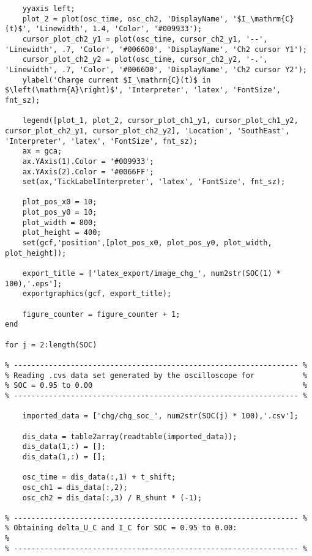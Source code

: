 \begin{lstlisting}
    yyaxis left;
    plot_2 = plot(osc_time, osc_ch2, 'DisplayName', '$I_\mathrm{C}(t)$', 'Linewidth', 1.4, 'Color', '#009933');
    cursor_plot_ch2_y1 = plot(osc_time, cursor_ch2_y1, '--', 'Linewidth', .7, 'Color', '#006600', 'DisplayName', 'Ch2 cursor Y1');
    cursor_plot_ch2_y2 = plot(osc_time, cursor_ch2_y2, '-.', 'Linewidth', .7, 'Color', '#006600', 'DisplayName', 'Ch2 cursor Y2');
    ylabel('Charge current $I_\mathrm{C}(t)$ in $\left(\mathrm{A}\right)$', 'Interpreter', 'latex', 'FontSize', fnt_sz);

    legend([plot_1, plot_2, cursor_plot_ch1_y1, cursor_plot_ch1_y2, cursor_plot_ch2_y1, cursor_plot_ch2_y2], 'Location', 'SouthEast', 'Interpreter', 'latex', 'FontSize', fnt_sz);
    ax = gca;
    ax.YAxis(1).Color = '#009933';
    ax.YAxis(2).Color = '#0066FF';
    set(ax,'TickLabelInterpreter', 'latex', 'FontSize', fnt_sz);

    plot_pos_x0 = 10;
    plot_pos_y0 = 10;
    plot_width = 800;
    plot_height = 400;
    set(gcf,'position',[plot_pos_x0, plot_pos_y0, plot_width, plot_height]);

    export_title = ['latex_export/image_chg_', num2str(SOC(1) * 100),'.eps'];
    exportgraphics(gcf, export_title);

    figure_counter = figure_counter + 1;
end

for j = 2:length(SOC)
    
% ----------------------------------------------------------------- %
% Reading .cvs data set generated by the oscilloscope for           %
% SOC = 0.95 to 0.00                                                %
% ----------------------------------------------------------------- %
    
    imported_data = ['chg/chg_soc_', num2str(SOC(j) * 100),'.csv'];

    dis_data = table2array(readtable(imported_data));                     
    dis_data(1,:) = [];                                                   
    dis_data(1,:) = [];                                                   

    osc_time = dis_data(:,1) + t_shift;                                  
    osc_ch1 = dis_data(:,2);                                            
    osc_ch2 = dis_data(:,3) / R_shunt * (-1);                          

% ----------------------------------------------------------------- %
% Obtaining delta_U_C and I_C for SOC = 0.95 to 0.00:                   %
% ----------------------------------------------------------------- %


\end{lstlisting}

